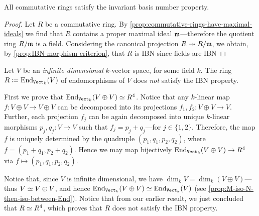 \begin{theorem}
\label{thm:commutative-rings-satisfy-IBN}
All commutative rings satisfy the invariant basis number property.
\end{theorem}

\begin{proof}
Let \(R\) be a commutative ring. By
\cref{prop:commutative-rings-have-maximal-ideals} we find that \(R\) contains a
proper maximal ideal \(\mathfrak{m}\)---therefore the quotient ring \(R/\mathfrak{m}\)
is a field. Considering the canonical projection \(R \twoheadrightarrow R/\mathfrak{m}\), we
obtain, by \cref{prop:IBN-morphism-criterion}, that \(R\) is IBN since fields
are IBN
\end{proof}

\begin{example}
\label{exp:End(V)-isnt-IBN}
Let \(V\) be an \emph{infinite dimensional} \(k\)-vector space, for some field
\(k\). The ring \(R \coloneq \operatorname{End}_{{\texttt{Vect}}_k}(V)\) of endomorphisms of \(V\) does
\emph{not} satisfy the IBN property.

First we prove that \(\operatorname{End}_{{\texttt{Vect}}_k}(V \oplus V) \simeq R^4\). Notice that any
\(k\)-linear map \(f: V \oplus V \to V \oplus V\) can be decomposed into its
projections \(f_1, f_2: V \oplus V \to V\). Further, each projection \(f_j\) can
be again decomposed into unique \(k\)-linear morphisms \(p_j, q_j: V \to V\)
such that \(f_j = p_j + q_j\)---for \(j \in \{1, 2\}\). Therefore, the map \(f\)
is uniquely determined by the quadruple \((p_1, q_1, p_2, q_2)\), where \(f =
(p_1 + q_1, p_2 + q_2)\). Hence we may map bijectively \(\operatorname{End}_{{\texttt{Vect}}_k}(V \oplus
V) \to R^4\) via \(f \mapsto (p_1, q_1, p_2, q_2)\).

Notice that, since \(V\) is infinite dimensional, we have
\(\dim_k V = \dim_k(V \oplus V)\)---thus \(V \simeq V \oplus V\), and hence
\(\operatorname{End}_{{\texttt{Vect}}_k}(V \oplus V) \simeq \operatorname{End}_{{\texttt{Vect}}_k}(V)\) (see
\cref{prop:M-iso-N-then-iso-between-End}). Notice that from our earlier result,
we just concluded that \(R \simeq R^4\), which proves that \(R\) does not satisfy
the IBN property.
\end{example}

